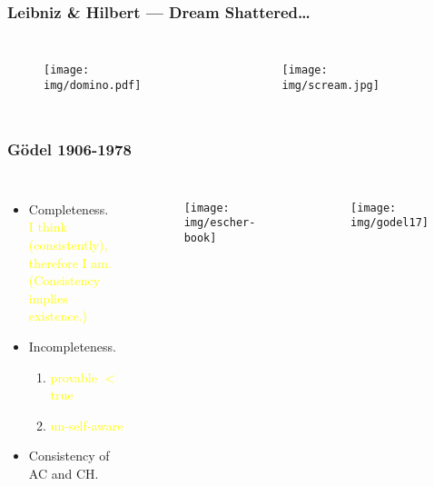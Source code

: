 \documentclass[UTF8,aspectratio=43,11pt,colorlinks,compress,openany]{beamer}%
\begin{document}
\begin{frame}\frametitle{Leibniz \& Hilbert --- Dream Shattered\dots}
\begin{columns}
	\begin{figure}
		\texttt{[image: img/domino.pdf]}
	\end{figure}
	\begin{figure}
		\texttt{[image: img/scream.jpg]}
	\end{figure}
\end{columns}
\end{frame}

\begin{frame}\frametitle{G\"odel 1906-1978}
\centerline{}
	\begin{columns}
			\begin{itemize}
				\item Completeness.\\
				\textcolor{yellow}{\small I think (consistently), therefore I am.\\ (Consistency implies existence.)}
				\item Incompleteness.
				\begin{enumerate}
					\item \textcolor{yellow}{\small provable $<$ true}
					\item \textcolor{yellow}{\small un-self-aware}
				\end{enumerate}
				\item Consistency of AC and CH.
			\end{itemize}\vspace{-7pt}
			\begin{figure}
				\texttt{[image: img/escher-book]}
			\end{figure}
			\begin{figure}
				\texttt{[image: img/godel17]}
			\end{figure}
	\end{columns}
\end{frame}
\end{document}
